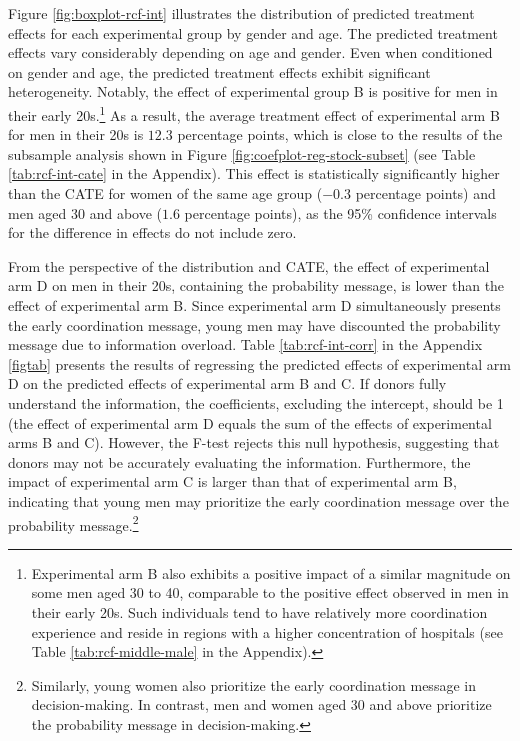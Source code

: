 \documentclass[12pt, a4paper]{article}
\begin{document}
Figure \ref{fig:boxplot-rcf-int} illustrates the distribution of predicted treatment effects for each experimental group by gender and age. The predicted treatment effects vary considerably depending on age and gender. Even when conditioned on gender and age, the predicted treatment effects exhibit significant heterogeneity. Notably, the effect of experimental group B is positive for men in their early 20s.\footnote{Experimental arm B also exhibits a positive impact of a similar magnitude on some men aged 30 to 40, comparable to the positive effect observed in men in their early 20s. Such individuals tend to have relatively more coordination experience and reside in regions with a higher concentration of hospitals (see Table \ref{tab:rcf-middle-male} in the Appendix).} As a result, the average treatment effect of experimental arm B for men in their 20s is \(12.3\) percentage points, which is close to the results of the subsample analysis shown in Figure \ref{fig:coefplot-reg-stock-subset} (see Table \ref{tab:rcf-int-cate} in the Appendix). This effect is statistically significantly higher than the CATE for women of the same age group (\(-0.3\) percentage points) and men aged 30 and above (\(1.6\) percentage points), as the 95\% confidence intervals for the difference in effects do not include zero.

From the perspective of the distribution and CATE, the effect of experimental arm D on men in their 20s, containing the probability message, is lower than the effect of experimental arm B. Since experimental arm D simultaneously presents the early coordination message, young men may have discounted the probability message due to information overload. Table \ref{tab:rcf-int-corr} in the Appendix \ref{figtab} presents the results of regressing the predicted effects of experimental arm D on the predicted effects of experimental arm B and C. If donors fully understand the information, the coefficients, excluding the intercept, should be 1 (the effect of experimental arm D equals the sum of the effects of experimental arms B and C). However, the F-test rejects this null hypothesis, suggesting that donors may not be accurately evaluating the information. Furthermore, the impact of experimental arm C is larger than that of experimental arm B, indicating that young men may prioritize the early coordination message over the probability message.\footnote{Similarly, young women also prioritize the early coordination message in decision-making. In contrast, men and women aged 30 and above prioritize the probability message in decision-making.}
\end{document}
